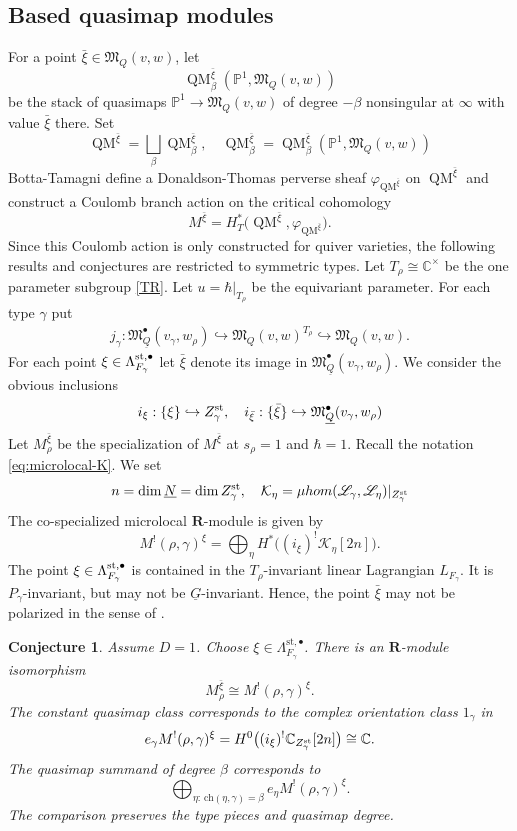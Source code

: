 \documentclass[11pt,reqno]{amsart}
\newtheorem{Conjecture}[Theorem]{Conjecture}
\theoremstyle{definition}
\theoremstyle{remark}
\def\bbC{\mathbb C}
\def\dN{\underline N}
\def\dG{\underline G}
\def\dQ{\underline Q}
\def\muhom{\mu hom}
\def\bR{\mathbf R}
\def\M{\mathfrak M}
\begin{document}
\subsection{Based quasimap modules}
For a point $\bar\xi\in \M_Q(v,w)$, let 
$$\operatorname{QM}^{\bar\xi}_\beta(\mathbb P^1, \M_Q(v,w))$$ be the stack of quasimaps
$\mathbb P^1\to \M_Q(v,w)$ of degree $-\beta$ nonsingular at $\infty$
with value $\bar\xi$ there. Set
$$\operatorname{QM}^{\bar\xi}=\bigsqcup_\beta\operatorname{QM}^{\bar\xi}_\beta
,\quad
\operatorname{QM}^{\bar\xi}_\beta=\operatorname{QM}^{\bar\xi}_\beta(\mathbb P^1, \M_Q(v,w))$$
Botta-Tamagni \cite[Thm.~E]{BT26} define a Donaldson-Thomas perverse sheaf
$\varphi_{\operatorname{QM}^{\bar\xi}}$ on $\operatorname{QM}^{\bar\xi}$ and
construct a Coulomb branch action on the critical cohomology
\[M^{\bar\xi}=H_T^*\bigl(\operatorname{QM}^{\bar\xi},\varphi_{\operatorname{QM}^{\bar\xi}}\bigr).\]
Since this Coulomb action is only constructed for quiver varieties, the following results
and conjectures are restricted to symmetric types.
Let $T_\rho\cong\mathbb C^\times$ be the one parameter subgroup \eqref{TR}.
Let $u=\hbar|_{T_\rho}$ be the equivariant parameter. 
For each type $\gamma$ put
\begin{align}\label{JG}
j_\gamma:\M_{\dQ}^\bullet(v_\gamma,w_\rho)\hookrightarrow \M_Q(v,w)^{T_\rho}\hookrightarrow \M_Q(v,w).
\end{align}
For each point $\xi\in\Lambda_{F_\gamma}^{\rm st,\bullet}$ let
$\bar\xi$ denote its image in $\M_{\dQ}^\bullet(v_\gamma,w_\rho)$.
We consider the obvious inclusions
$$i_\xi:\{\xi\}\hookrightarrow Z_\gamma^{\rm st}
,\quad
i_{\bar\xi}:\{\bar\xi\}\hookrightarrow \M_{\dQ}^\bullet(v_\gamma,w_\rho)$$
Let $M^{\bar\xi}_\rho$ be the specialization of $M^{\bar\xi}$ at $s_\rho=1$ and $\hbar=1$.
Recall the notation \eqref{eq:microlocal-K}. We set 
$$n=\dim\dN=\dim Z_\gamma^{\rm st}
,\quad
\mathcal K_\eta=\muhom(\mathscr L_\gamma,\mathscr L_\eta)|_{Z_\gamma^{\rm st}}$$
The co-specialized microlocal $\bR$-module is given by
\[M^!(\rho,\gamma)^\xi=\bigoplus_\eta H^*\bigl((i_\xi)^!\mathcal K_\eta[2n]\bigr).\]
The point $\xi\in\Lambda_{F_\gamma}^{\rm st,\bullet}$ is contained in the
$T_\rho$-invariant linear Lagrangian  $L_{F_\gamma}$.
It is $P_\gamma$-invariant, but may not be $\dG$-invariant.
Hence, the point $\bar\xi$ may not be polarized in the sense of \cite[\S1.3.5]{BT26}.


\begin{Conjecture}\label{conj:BT-specialized}
Assume $D=1$. 
Choose $\xi\in\Lambda_{F_\gamma}^{\mathrm{st},\bullet}$. 
There is an  $\bR$-module isomorphism
\[
 M^{\bar\xi}_\rho\cong M^!(\rho,\gamma)^\xi.
\]
The constant quasimap class corresponds to the complex orientation class $1_\gamma$ in
\[
 e_\gamma M^!(\rho,\gamma)^\xi
 =H^0\bigl((i_\xi)^!\bbC_{Z_\gamma^{\rm st}}[2n]\bigr)\cong\bbC.
\]
The quasimap summand of degree $\beta$ corresponds to
\[
 \bigoplus_{\eta:\,\mathrm{ch}(\eta,\gamma)=\beta}
 e_\eta M^!(\rho,\gamma)^\xi.
\]
The comparison preserves the type pieces and quasimap degree.
\end{Conjecture}
\end{document}
